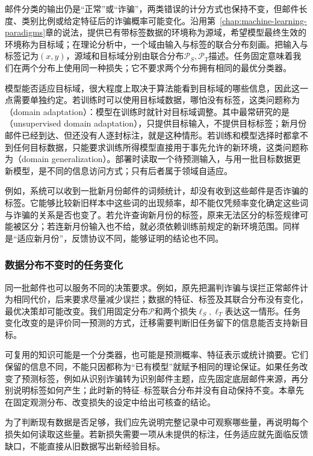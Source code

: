 邮件分类的输出仍是“正常”或“诈骗”，两类错误的计分方式也保持不变，但邮件长度、类别比例或给定特征后的诈骗概率可能变化。沿用第~\ref{chap:machine-learning-paradigms}章的说法，提供已有带标签数据的环境称为源域，希望模型最终生效的环境称为目标域；在理论分析中，一个域由输入与标签的联合分布刻画。把输入与标签记为$(x,y)$，源域和目标域分别由联合分布$\mathcal P_S,\mathcal P_T$描述。任务固定意味着我们在两个分布上使用同一种损失；它不要求两个分布拥有相同的最优分类器。

模型能否适应目标域，很大程度上取决于算法能看到目标域的哪些信息，因此这一点需要单独约定。若训练时可以使用目标域数据，哪怕没有标签，这类问题称为（domain adaptation）：模型在训练时就针对目标域调整。其中最常研究的是（unsupervised domain adaptation），只提供目标输入，不提供目标标签；新月份邮件已经到达、但还没有人逐封标注，就是这种情形。若训练和模型选择时都拿不到任何目标数据，只能要求训练所得模型直接用于事先允许的新环境，这类问题称为（domain generalization）。部署时读取一个待预测输入，与用一批目标数据更新模型，是不同的信息访问方式；只有后者属于领域自适应。

例如，系统可以收到一批新月份邮件的词频统计，却没有收到这些邮件是否诈骗的标签。它能够比较新旧样本中这些词的出现频率，却不能仅凭频率变化确定这些词与诈骗的关系是否也变了。若允许查询新月份的标签，原来无法区分的标签规律可能被区分；若连新月份输入也不给，就必须依赖训练前规定的新环境范围。同样是“适应新月份”，反馈协议不同，能够证明的结论也不同。

\subsubsection{数据分布不变时的任务变化}

同一批邮件也可以服务不同的决策要求。例如，原先把漏判诈骗与误拦正常邮件计为相同代价，后来要求尽量减少误拦；数据的特征、标签及其联合分布没有变化，最优决策却可能改变。我们用固定分布$\mathcal P$和两个损失$\ell_S,\ell_T$表达这一情形。任务变化改变的是评价同一预测的方式，迁移需要判断旧任务留下的信息能否支持新目标。

可复用的知识可能是一个分类器，也可能是预测概率、特征表示或统计摘要。它们保留的信息不同，不能只因都称为“已有模型”就赋予相同的理论保证。如果任务改变了预测标签，例如从识别诈骗转为识别邮件主题，应先固定底层邮件来源，再分别说明标签如何产生；此时新的特征--标签联合分布并没有自动保持不变。本章先在固定观测分布、改变损失的设定中给出可核查的结论。

为了判断现有数据是否足够，我们应先说明完整记录中可观察哪些量，再说明每个损失如何读取这些量。若新损失需要一项从未提供的标注，任务适应就先面临反馈缺口，不能直接从旧数据写出新经验目标。

